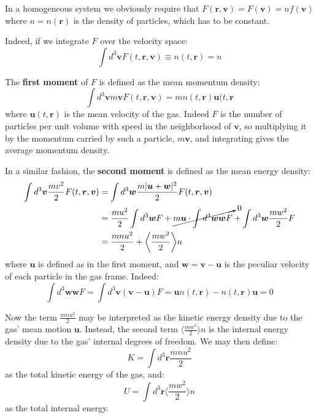 \documentclass[a4paper,11pt,oneside]{book}
\newcommand{\BF}[1]{\boldsymbol{#1}}
\begin{document}
In a homogeneous system we obviously require that $F(\BF{r}, \BF{v})=F(\BF{v}) = n f(\BF{v})$ where $n = n(\BF{r})$ is the density of particles, which has to be constant. 

Indeed, if we integrate $F$ over the velocity space:
\begin{equation}
    \int d^3\BF{v} F(t,\BF{r},\BF{v}) \equiv n(t,\BF{r}) = n
\end{equation}

The \textbf{first moment} of $F$ is defined as the mean momentum density:
\begin{equation}
    \int d^3 \BF{v} m\BF{v} F(t,\BF{r}, \BF{v}) = mn(t,\BF{r}) \BF{u}(t,\BF{r}
\end{equation}
where $\BF{u}(t,\BF{r})$ is the mean velocity of the gas. Indeed $F$ is the number of particles per unit volume with speed in the neighborhood of $\BF{v}$, so multiplying it by the momentum carried by such a particle, $m\BF{v}$, and integrating gives the average momentum density. 


In a similar fashion, the \textbf{second moment} is defined as the mean energy density:
\begin{align}
    \int d^3\BF{v}  \frac{mv^2}{2} F(t,\BF{r}, \BF{v}) &= \int d^3 \BF{w} \frac{m|\BF{u}+\BF{w}|^2}{2} F(t,\BF{r}, \BF{v})\\
    &= \frac{mu^2}{2} \int d^3 \BF{w} F + \cancelto{0}{m\BF{u} \cdot \int d^3 \BF{w} \BF{w} F} + \int d^3\BF{w} \frac{mw^2}{2} F \\
    &= \frac{mnu^2}{2} + \bigg \langle{\frac{mw^2}{2}\bigg \rangle}n
\end{align}
where $\BF{u}$ is defined as in the first moment, and $\BF{w} = \BF{v} - \BF{u}$ is the peculiar velocity of each particle in the gas frame. Indeed:
\begin{equation}
    \int d^3 \BF{w} \BF{w} F = \int d^3 \BF{v} (\BF{v} - \BF{u}) F = \BF{u}n(t,\BF{r}) -n(t, \BF{r}) \BF{u} =0
\end{equation}

Now the term $\frac{mnu^2}{2}$ may be interpreted as the kinetic energy density due to the gas' mean motion $\BF{u}$. Instead, the second term $\bigg \langle{\frac{mw^2}{2}\bigg \rangle}n$ is the internal energy density due to the gas' internal degrees of freedom. We may then define:
\begin{equation}
    K = \int d^3 \BF{r} \frac{mnu^2}{2}
\end{equation}
as the total kinetic energy of the gas, and:
\begin{equation}
    U = \int d^3 \BF{r} \bigg \langle{\frac{mw^2}{2}\bigg \rangle}n
\end{equation}
as the total internal energy. 
\end{document}
